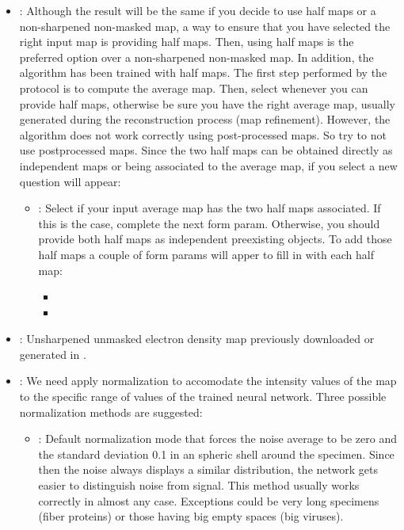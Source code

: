 \begin{itemize}
    \begin{itemize}
        \item {}: Although the result will be the same if you decide to use half maps or a non-sharpened non-masked map, a way to ensure that you have selected the right input map is providing half maps. Then, using half maps is the preferred option over a non-sharpened non-masked map. In addition, the algorithm has been trained with half maps. The first step performed by the protocol is to compute the average map. Then, select  whenever you can provide half maps, otherwise be sure you have the right average map, usually generated during the reconstruction process (map refinement). However, the algorithm does not work correctly using post-processed maps. So try to not use postprocessed maps. Since the two half maps can be obtained directly as independent maps or being associated to the average map, if you select  a new question will appear:
            \begin{itemize}
            \item {}: Select  if your input average map has the two half maps associated. If this is the case, complete the next form param. Otherwise, you should provide both half maps as independent preexisting \scipion objects. To add those half maps a couple of form params will apper to fill in with each half map:
                \begin{itemize}
                \item {}
                \item {}
                \end{itemize}
            \end{itemize}
        \item {}: Unsharpened unmasked electron density map previously downloaded or generated in \scipion.
        \item {}: We need apply normalization to accomodate the intensity values of the map to the specific range of values of the trained neural network. Three possible normalization methods are suggested:
        \begin{itemize}
            \item {}: Default normalization mode that forces the noise average to be zero and the standard deviation 0.1 in an spheric shell around the specimen. Since then the noise always displays a similar distribution, the network gets easier to distinguish noise from signal. This method usually works correctly in almost any case. Exceptions could be very long specimens (fiber proteins) or those having big empty spaces (big viruses).

\end{itemize}
\end{itemize}
\end{itemize}
